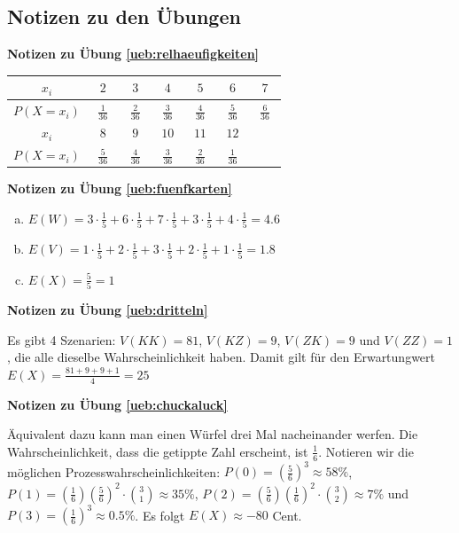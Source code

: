 \documentclass[%
<<<<<<< Updated upstream
11pt,%
twoside,%
titlepage,%
german,%
=======
11pt,%
twoside,%
titlepage,%
swissgerman,%
>>>>>>> Stashed changes
headsepline%
]{scrartcl}
\newcommand{\faReturnGray}{\textcolor{gray}{\faMailReply}} %
\newcommand{\spaltenheight}{\rule{0mm}{3ex}}
\newcommand{\spaltensep}{\\[1ex]}
\theoremstyle{definition}
\theoremstyle{plain}
\newcommand{\concatueb}[1]{ueb:#1}%
\newcommand{\concatlsg}[1]{lsg:#1}%
\newenvironment{lsg}[1]{%
    \par\noindent\textbf{Notizen zu Übung \ref{\concatueb{#1}}}\label{\concatlsg{#1}}
    \hfill\hyperref[\concatueb{#1}]{\faReturnGray}\par %
}{%
    \par%
}
\newcommand{\concatueb}[1]{ueb:#1}%
\newcommand{\concatlsg}[1]{lsg:#1}%
\newenvironment{lsg}[1]{%
    \par\noindent\textbf{Notizen zu Übung \ref{\concatueb{#1}}.}%
    \label{\concatlsg{#1}}
}{%
    \par%
}
\begin{document}
\clearpage

\subsection{Notizen zu den Übungen}

\begin{lsg}{relhaeufigkeiten}
    \begin{center}
\begin{tabular}{|c|c|c|c|c|c|c|}
\hline
\rowcolor{Gray}\spaltenheight $\;\; x_i\;\;$ & $\;\;2\;\;$ & $\;\;3\;\;$ & $\;\;4\;\;$ & $\;\;5\;\;$ & $\;\;6\;\;$ & $\;\;7\;\;$\spaltensep \hline
\rowcolor{lightyellow}\rule{0mm}{3ex} $P(X=x_i)$ & $\frac{1}{36}$ & $\frac{2}{36}$ & $\frac{3}{36}$ & $\frac{4}{36}$ & $\frac{5}{36}$ & $\frac{6}{36}$\\[1ex] \hline
\rowcolor{Gray}\spaltenheight $\;\; x_i\;\;$ & $\;\;8\;\;$ & $\;\;9\;\;$ & $\;10\;$ & $\;11\;$ & $\;12\;$ & \phantom{$\;12\;$}\spaltensep \hline
\rowcolor{lightyellow}\rule{0mm}{3ex} $P(X=x_i)$ & $\frac{5}{36}$ & $\frac{4}{36}$ & $\frac{3}{36}$ & $\frac{2}{36}$ & $\frac{1}{36}$ & \\[1ex] \hline
\end{tabular}
\end{center}
\end{lsg}
\begin{lsg}{fuenfkarten}
    \begin{enumerate}[a)]
        \item $E(W)=3\cdot\frac{1}{5}+6\cdot\frac{1}{5}+7\cdot\frac{1}{5}+3\cdot\frac{1}{5}+4\cdot\frac{1}{5}=4.6$
        \item $E(V)=1\cdot\frac{1}{5}+2\cdot\frac{1}{5}+3\cdot\frac{1}{5}+2\cdot\frac{1}{5}+1\cdot\frac{1}{5}=1.8$
        \item $E(X)=\frac{5}{5}=1$
    \end{enumerate}
\end{lsg}
\begin{lsg}{dritteln}
    Es gibt 4 Szenarien: $V(KK)=81$, $V(KZ)=9$, $V(ZK)=9$ und $V(ZZ)=1$, die alle dieselbe Wahrscheinlichkeit haben. Damit gilt für den Erwartungwert $E(X)=\frac{81+9+9+1}{4}=25$
\end{lsg}
\begin{lsg}{chuckaluck}
    Äquivalent dazu kann man einen Würfel drei Mal nacheinander werfen. Die Wahrscheinlichkeit, dass die getippte Zahl erscheint, ist $\frac{1}{6}$. Notieren wir die möglichen Prozesswahrscheinlichkeiten: $P(0)=(\frac{5}{6})^3\approx58\%$, $P(1)=(\frac{1}{6})(\frac{5}{6})^2\cdot\binom{3}{1}\approx35\%$, $P(2)=(\frac{5}{6})(\frac{1}{6})^2\cdot\binom{3}{2}\approx7\%$ und $P(3)=(\frac{1}{6})^3\approx0.5\%$. Es folgt $E(X)\approx-80$ Cent.
\end{lsg}
\end{document}
